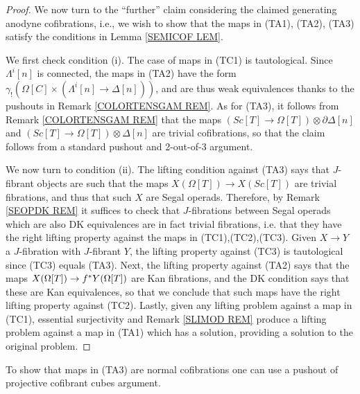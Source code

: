 \documentclass[a4paper,10pt
,draft
]{article}%
\renewcommand{\1}{\eta}%
\begin{document}
\begin{proof}
We now turn to the ``further'' claim considering the claimed generating anodyne cofibrations, i.e., 
we wish to show that the maps in 
(TA1), (TA2), (TA3) satisfy the conditions in
Lemma \ref{SEMICOF LEM}.

We first check condition (i).
The case of maps in (TC1) is tautological.
Since $\Lambda^{i}[n]$ is connected, 
the maps in (TA2) have the form
$\gamma_{!} 
\left( \Omega[C] \times
\left( \Lambda^i[n] \to \Delta[n] \right) \right)$,
and are thus weak equivalences thanks to the pushouts
in Remark \ref{COLORTENSGAM REM}.
As for (TA3), it follows from Remark \ref{COLORTENSGAM REM}
that the maps
$\left( Sc[T] \to \Omega[T] \right) \otimes \partial \Delta[n]$
and 
$\left( Sc[T] \to \Omega[T] \right) \otimes \Delta[n]$
are trivial cofibrations, so that the claim follows from a standard pushout and 2-out-of-3 argument.

We now turn to condition (ii).
The lifting condition against (TA3) says that $J$-fibrant objects are such that the maps $X(\Omega[T]) \to X(Sc[T])$
are trivial fibrations, and thus that such $X$ are Segal operads.
Therefore, by Remark \ref{SEOPDK REM} it suffices to check that $J$-fibrations between Segal operads which are also DK equivalences are in fact trivial fibrations, i.e. that they have the right lifting property against the maps in (TC1),(TC2),(TC3).
Given $X \to Y$ a $J$-fibration with $J$-fibrant $Y$,
the lifting property against (TC3) is tautological since 
(TC3) equals (TA3).
Next, the lifting property against (TA2) says that the maps
$X(\Omega[T]) \to f^{\**} Y(\Omega[T])$
are Kan fibrations, and the DK condition says that these are Kan equivalences,
so that we conclude that such maps have the right lifting property against (TC2).
Lastly, given any lifting problem against a map in (TC1),
essential surjectivity and Remark \ref{SLIMOD REM}
produce a lifting problem against a map in (TA1) which has a solution, providing a solution to the original problem.
\end{proof}


{\color{red} To show that maps in (TA3) are normal cofibrations one can use a pushout of projective cofibrant cubes argument.}
\end{document}
